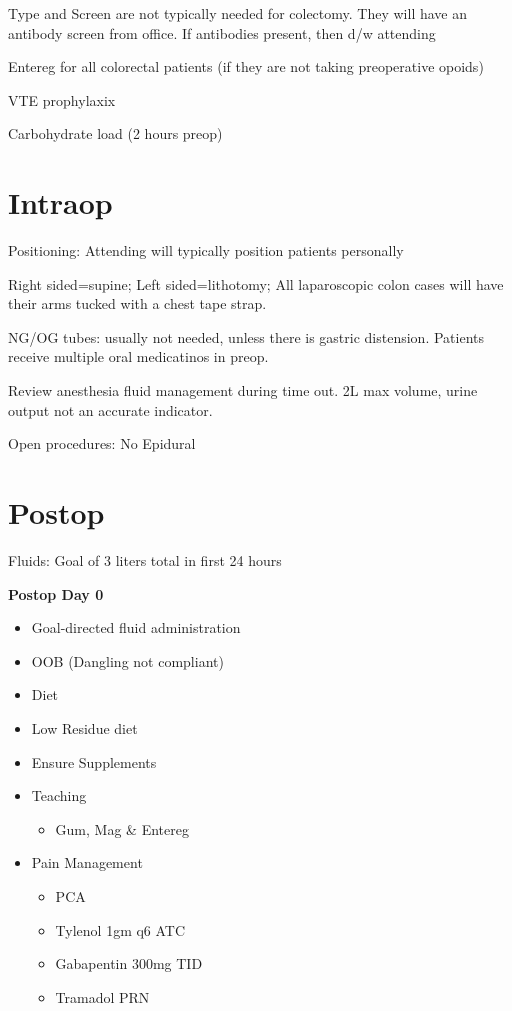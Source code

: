 \documentclass[
  letterpaper,
]{scrbook}
\providecommand{\tightlist}{%
  \setlength{\itemsep}{0pt}\setlength{\parskip}{0pt}}
\begin{document}
Type and Screen are not typically needed for colectomy. They will have
an antibody screen from office. If antibodies present, then d/w
attending

Entereg for all colorectal patients (if they are not taking preoperative
opoids)

VTE prophylaxix

Carbohydrate load (2 hours preop)

\section{Intraop}\label{intraop}

Positioning: Attending will typically position patients personally

Right sided=supine; Left sided=lithotomy; All laparoscopic colon cases
will have their arms tucked with a chest tape strap.

NG/OG tubes: usually not needed, unless there is gastric distension.
Patients receive multiple oral medicatinos in preop.

Review anesthesia fluid management during time out. 2L max volume, urine
output not an accurate indicator.

Open procedures: No Epidural

\section{Postop}\label{postop}

Fluids: Goal of 3 liters total in first 24 hours

\textbf{Postop Day 0}

\begin{itemize}
\tightlist
\item
  Goal-directed fluid administration
\item
  OOB (Dangling not compliant)
\item
  Diet
\item
  Low Residue diet
\item
  Ensure Supplements
\item
  Teaching

  \begin{itemize}
  \tightlist
  \item
    Gum, Mag \& Entereg
  \end{itemize}
\item
  Pain Management

  \begin{itemize}
  \tightlist
  \item
    PCA
  \item
    Tylenol 1gm q6 ATC
  \item
    Gabapentin 300mg TID
  \item
    Tramadol PRN
  \end{itemize}
\end{itemize}
\end{document}
